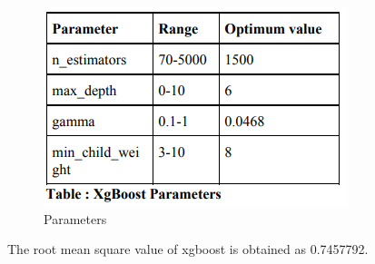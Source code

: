 \begin{figure}[h]
\label{bd}
\centering
\includegraphics[width= 11 cm]{xg1.png}
\caption{Parameters}
\end{figure}
The root mean square value of xgboost is obtained as 0.7457792.\pagebreak

